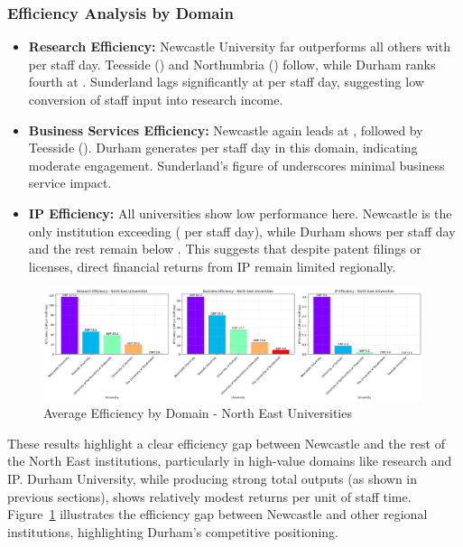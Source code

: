 \documentclass[journal,onecolumn, 10pt,draftclsnofoot]{IEEEtran}
\begin{document}
\subsubsection{Efficiency Analysis by Domain}

\begin{itemize}
    \item \textbf{Research Efficiency:} Newcastle University far outperforms all others with  per staff day. Teesside () and Northumbria () follow, while Durham ranks fourth at . Sunderland lags significantly at  per staff day, suggesting low conversion of staff input into research income.
    
    \item \textbf{Business Services Efficiency:} Newcastle again leads at , followed by Teesside (). Durham generates  per staff day in this domain, indicating moderate engagement. Sunderland's figure of  underscores minimal business service impact.
    
    \item \textbf{IP Efficiency:} All universities show low performance here. Newcastle is the only institution exceeding  ( per staff day), while Durham shows  per staff day and the rest remain below . This suggests that despite patent filings or licenses, direct financial returns from IP remain limited regionally.
\end{itemize}



\begin{figure}[h]
\centering
\includegraphics[width=0.99\textwidth]{Fig/figure38.ne_efficiency_comparison.png}
\caption{Average Efficiency by Domain - North East Universities}
\label{fig:ne-efficiency-comparison}
\end{figure}

These results highlight a clear efficiency gap between Newcastle and the rest of the North East institutions, particularly in high-value domains like research and IP. Durham University, while producing strong total outputs (as shown in previous sections), shows relatively modest returns per unit of staff time. Figure~\ref{fig:ne-efficiency-comparison} illustrates the efficiency gap between Newcastle and other regional institutions, highlighting Durham's competitive positioning.
\end{document}
